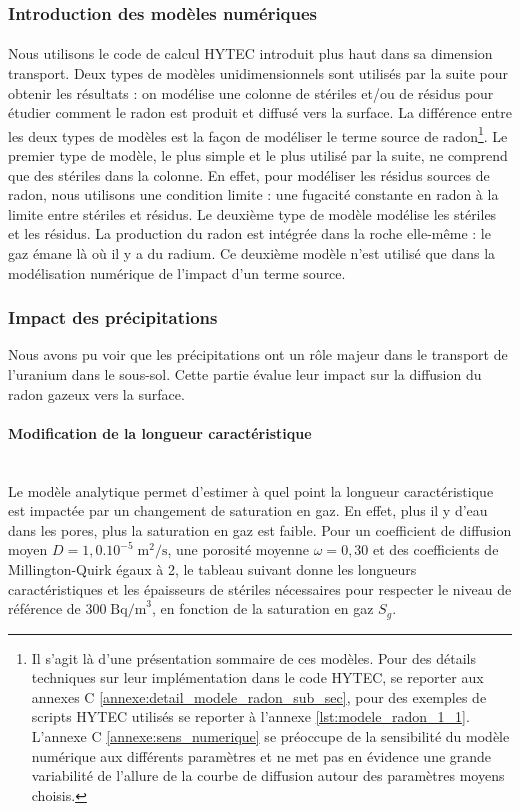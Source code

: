 \documentclass{article}
\begin{document}
\subsubsection{Introduction des modèles numériques}

\paragraph{} Nous utilisons le code de calcul HYTEC introduit plus haut dans sa dimension transport. Deux types de modèles unidimensionnels sont utilisés par la suite pour obtenir les résultats : on modélise une colonne de stériles et/ou de résidus pour étudier comment le radon est produit et diffusé vers la surface. La différence entre les deux types de modèles est la façon de modéliser le terme source de radon\footnote{Il s’agit là d’une présentation sommaire de ces modèles. Pour des détails techniques sur leur implémentation dans le code HYTEC, se reporter aux annexes C \ref{annexe:detail_modele_radon_sub_sec}, pour des exemples de scripts HYTEC utilisés se reporter à l'annexe \ref{lst:modele_radon_1_1}. L'annexe C \ref{annexe:sens_numerique} se préoccupe de la sensibilité du modèle numérique aux différents paramètres et ne met pas en évidence une grande variabilité de l'allure de la courbe de diffusion autour des paramètres moyens choisis.}. Le premier type de modèle, le plus simple et le plus utilisé par la suite, ne comprend que des stériles dans la colonne. En effet, pour modéliser les résidus sources de radon, nous utilisons une condition limite : une fugacité constante en radon à la limite entre stériles et résidus. Le deuxième type de modèle modélise les stériles et les résidus. La production du radon est intégrée dans la roche elle-même : le gaz émane là où il y a du radium. Ce deuxième modèle n'est utilisé que dans la modélisation numérique de l'impact d'un terme source.


\subsubsection{Impact des précipitations}

Nous avons pu voir que les précipitations ont un rôle majeur dans le transport de l'uranium dans le sous-sol. Cette partie évalue leur impact sur la diffusion du radon gazeux vers la surface.

\paragraph{Modification de la longueur caractéristique \\ \\}
Le modèle analytique permet d'estimer à quel point la longueur caractéristique est impactée par un changement de saturation en gaz. En effet, plus il y d’eau dans les pores, plus la saturation en gaz est faible. Pour un coefficient de diffusion moyen $D=1,0.10^{-5} \; \text{m}^2/\text{s}$, une porosité moyenne $\omega=0,30$ et des coefficients de Millington-Quirk égaux à 2, le tableau suivant donne les longueurs caractéristiques et les épaisseurs de stériles nécessaires pour respecter le niveau de référence de $300\; \text{Bq/m}^3$, en fonction de la saturation en gaz $S_g$. 
\end{document}
